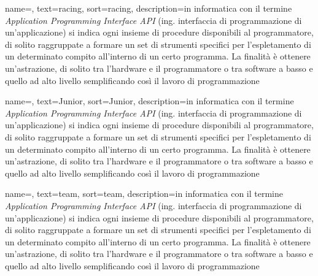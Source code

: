 
\renewcommand{\acronymname}{Acronimi e abbreviazioni}




{
    name=,
    text=racing,
    sort=racing,
    description={in informatica con il termine \emph{Application Programming Interface API} (ing. interfaccia di programmazione di un'applicazione) si indica ogni insieme di procedure disponibili al programmatore, di solito raggruppate a formare un set di strumenti specifici per l'espletamento di un determinato compito all'interno di un certo programma. La finalità è ottenere un'astrazione, di solito tra l'hardware e il programmatore o tra software a basso e quello ad alto livello semplificando così il lavoro di programmazione}
}

{
	name=,
	text=Junior,
	sort=Junior,
	description={in informatica con il termine \emph{Application Programming Interface API} (ing. interfaccia di programmazione di un'applicazione) si indica ogni insieme di procedure disponibili al programmatore, di solito raggruppate a formare un set di strumenti specifici per l'espletamento di un determinato compito all'interno di un certo programma. La finalità è ottenere un'astrazione, di solito tra l'hardware e il programmatore o tra software a basso e quello ad alto livello semplificando così il lavoro di programmazione}
}

{
	name=,
	text=team,
	sort=team,
	description={in informatica con il termine \emph{Application Programming Interface API} (ing. interfaccia di programmazione di un'applicazione) si indica ogni insieme di procedure disponibili al programmatore, di solito raggruppate a formare un set di strumenti specifici per l'espletamento di un determinato compito all'interno di un certo programma. La finalità è ottenere un'astrazione, di solito tra l'hardware e il programmatore o tra software a basso e quello ad alto livello semplificando così il lavoro di programmazione}
}

